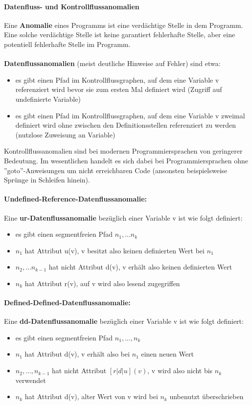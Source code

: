 \paragraph{Datenfluss- und Kontrollflussanomalien}
Eine \textbf{Anomalie} eines Programms ist eine verdächtige Stelle in dem Programm. Eine solche verdächtige Stelle ist keine garantiert fehlerhafte Stelle, aber eine potentiell fehlerhafte Stelle im Programm.
\\
\\
\textbf{Datenflussanomalien} (meist deutliche Hinweise auf Fehler) sind etwa:
\begin{itemize}
	\item es gibt einen Pfad im Kontrollflussgraphen, auf dem eine Variable v referenziert wird bevor sie zum ersten Mal definiert wird (Zugriff auf undefinierte Variable)
	\item es gibt einen Pfad im Kontrollflussgraphen, auf dem eine Variable v zweimal definiert wird ohne zwischen den Definitionsstellen referenziert zu werden (nutzlose Zuweisung an Variable)
\end{itemize}
Kontrollflussanomalien sind bei modernen Programmiersprachen von geringerer Bedeutung. Im wesentlichen handelt es sich dabei bei Programmiersprachen ohne ''goto''-Anweisungen um nicht erreichbaren Code (ansonsten beispielsweise Sprünge in Schleifen hinein).

\paragraph{Undefined-Reference-Datenflussanomalie:}
Eine \textbf{ur-Datenflussanomalie} bezüglich einer 
Variable v ist wie folgt definiert:
\begin{itemize}
	\item es gibt einen segmentfreien Pfad $n_{1}, ... n_{k}$
	\item $n_{1}$ hat Attribut u(v), v besitzt also keinen definierten Wert bei $n_{1}$
	\item $n_{2}, ... n_{k-1}$ hat nicht Attribut d(v), v erhält also keinen definierten Wert
	\item $n_{k}$ hat Attribut r(v), auf v wird also lesend zugegriffen
\end{itemize}

\paragraph{Defined-Defined-Datenflussanomalie:}
Eine \textbf{dd-Datenflussanomalie} bezüglich einer Variable v ist wie folgt definiert:
\begin{itemize}
	\item es gibt einen segmentfreien Pfad $n_{1}, ... , n_{k}$
	\item $n_{1}$ hat Attribut d(v), v erhält also bei $n_{1}$ einen neuen Wert
	\item $n_{2}, ... , n_{k-1}$ hat nicht Attribut $[r|d|u](v)$, v wird also nicht bis $n_{k}$ verwendet
	\item $n_{k}$ hat Attribut d(v), alter Wert von v wird bei $n_{k}$ unbenutzt überschrieben
\end{itemize}

